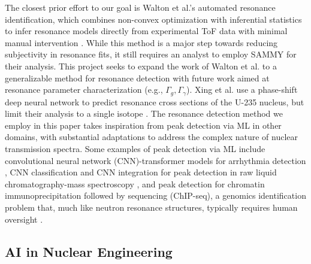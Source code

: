\documentclass{style/nseJournal}
\begin{document}
The closest prior effort to our goal is Walton et al.'s automated resonance identification, which combines non-convex optimization with inferential statistics to infer resonance models directly from experimental ToF data with minimal manual intervention \cite{waltonAutomatedResonanceIdentification2024}. While this method is a major step towards reducing subjectivity in resonance fits, it still requires an analyst to employ SAMMY for their analysis. This project seeks to expand the work of Walton et al. to a generalizable method for resonance detection with future work aimed at resonance parameter characterization (e.g., $\Gamma_g, \Gamma_{\gamma}$). Xing et al. use a phase-shift deep neural network to predict resonance cross sections of the U-235 nucleus, but limit their analysis to a single isotope \cite{xingPhaseShiftDeep2024}. The resonance detection method we employ in this paper takes inspiration from peak detection via ML in other domains, with substantial adaptations to address the complex nature of nuclear transmission spectra. Some examples of peak detection via ML include convolutional neural network (CNN)-transformer models for arrhythmia detection \cite{kimNovelHybridCNNtransformer2025}, CNN classification and CNN integration for peak detection in raw liquid chromatography-mass spectroscopy \cite{melnikovDeepLearningPrecise2020}, and peak detection for chromatin immunoprecipitation followed by sequencing (ChIP-seq), a genomics identification problem that, much like neutron resonance structures, typically requires human oversight \cite{ohCNNPeaksChIPSeqPeak2020}.

\subsection{AI in Nuclear Engineering}
\end{document}
